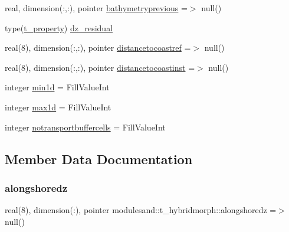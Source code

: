 \begin{DoxyCompactItemize}
\item 
real, dimension(\+:,\+:), pointer \mbox{\hyperlink{structmodulesand_1_1t__hybridmorph_a3e383fa9cad22a40ef923b8b086abb1d}{bathymetryprevious}} =$>$ null()
\item 
type(\mbox{\hyperlink{structmodulesand_1_1t__property}{t\+\_\+property}}) \mbox{\hyperlink{structmodulesand_1_1t__hybridmorph_ac09eca76224b805f9749a542dd93aa1c}{dz\+\_\+residual}}
\item 
real(8), dimension(\+:,\+:), pointer \mbox{\hyperlink{structmodulesand_1_1t__hybridmorph_ac0820c8d153bad36617e112138b4152b}{distancetocoastref}} =$>$ null()
\item 
real(8), dimension(\+:,\+:), pointer \mbox{\hyperlink{structmodulesand_1_1t__hybridmorph_a14f5c5299d5813d9db918c08153594af}{distancetocoastinst}} =$>$ null()
\item 
integer \mbox{\hyperlink{structmodulesand_1_1t__hybridmorph_a3f6e9e7ddf71f7f5621b0497b8c3f2e3}{min1d}} = Fill\+Value\+Int
\item 
integer \mbox{\hyperlink{structmodulesand_1_1t__hybridmorph_acb386b14e67ce1c09c6bba58d390575a}{max1d}} = Fill\+Value\+Int
\item 
integer \mbox{\hyperlink{structmodulesand_1_1t__hybridmorph_a726994eb724778aa29a0399114fae470}{notransportbuffercells}} = Fill\+Value\+Int
\end{DoxyCompactItemize}


\subsection{Member Data Documentation}
\mbox{\label{structmodulesand_1_1t__hybridmorph_a25db8371c7a387007ab3c0322f9c8a2f}} 
\subsubsection{\texorpdfstring{alongshoredz}{alongshoredz}}
{\footnotesize\ttfamily real(8), dimension(\+:), pointer modulesand\+::t\+\_\+hybridmorph\+::alongshoredz =$>$ null()\hspace{0.3cm}{\ttfamily [private]}}

\mbox{\label{structmodulesand_1_1t__hybridmorph_a5b66fce6228e5c57020039c44d0dd3ca}} 
